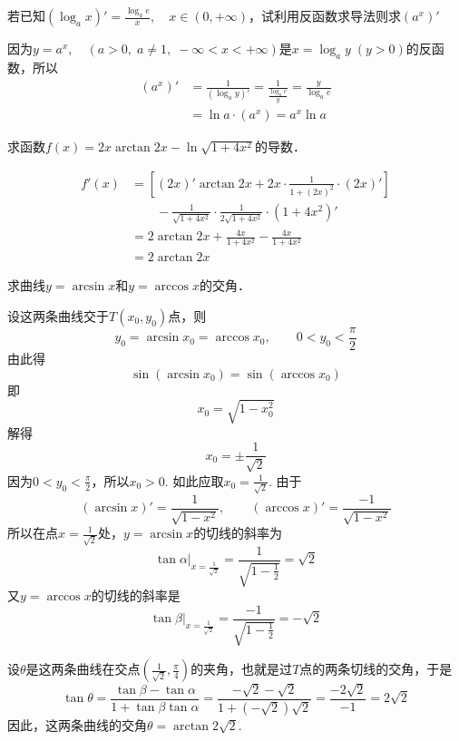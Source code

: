 \begin{example}
若已知$(\log_a x)'=\frac{\log_a e}{x},\quad x\in(0,+\infty)$，试利用反函数求导法则求$(a^x)'$    
\end{example}

\begin{solution}
    因为$y=a^x,\quad (a>0,\; a\ne 1,\; -\infty<x<+\infty)$是$x=\log_a y\; (y>0)$的反函数，所以
\begin{align*}
    (a^x)'&=\frac{1}{(\log_a y)'}=\frac{1}{\frac{\log_a e}{y}}=\frac{y}{\log_a e}\\
    &=\ln a\cdot (a^x)=a^x\ln a
\end{align*}
\end{solution}

\begin{example}
求函数$f(x)=2x\arctan 2x-\ln\sqrt{1+4x^2}$的导数．
\end{example}

\begin{solution}
\begin{align*}
    f'(x)&=\left[(2x)'\arctan 2x+2x\cdot \frac{1}{1+(2x)^2}\cdot (2x)'\right]\\
    &\qquad -\frac{1}{\sqrt{1+4x^2}}\cdot \frac{1}{2\sqrt{1+4x^2}}\cdot (1+4x^2)'\\
    &=2\arctan 2x+\frac{4x}{1+4x^2}-\frac{4x}{1+4x^2}\\
    &=2\arctan 2x
\end{align*}
\end{solution}


\begin{example}
求曲线$y=\arcsin x$和$y=\arccos x$的交角．
\end{example}

\begin{solution}
设这两条曲线交于$T(x_0,y_0)$点，则
\[y_0=\arcsin x_0=\arccos x_0,\qquad 0<y_0<\frac{\pi}{2}\]
  由此得
\begin{equation}
    \sin(\arcsin x_0)=\sin(\arccos x_0)
\end{equation}  
即
\[x_0=\sqrt{1-x^2_0}\]
解得
\[x_0=\pm\frac{1}{\sqrt{2}}\]
因为$0<y_0<\frac{\pi}{2}$，所以$x_0>0$. 如此应取$x_0=\frac{1}{\sqrt{2}}$. 由于
\[(\arcsin x)'=\frac{1}{\sqrt{1-x^2}},\qquad (\arccos x)'=\frac{-1}{\sqrt{1-x^2}}\]
所以在点$x=\frac{1}{\sqrt{2}}$处，$y=\arcsin x$的切线的斜率为
\[\tan\alpha\Big|_{x=\tfrac{1}{\sqrt{2}}}=\frac{1}{\sqrt{1-\frac{1}{2}}}=\sqrt{2}\]
又$y=\arccos x$的切线的斜率是
\[\tan\beta\Big|_{x=\tfrac{1}{\sqrt{2}}}=\frac{-1}{\sqrt{1-\frac{1}{2}}}=-\sqrt{2}\]

设$\theta$是这两条曲线在交点$\left(\frac{1}{\sqrt{2}},\frac{\pi}{4}\right)$的夹角，也就是过$T$点的两条切线的交角，于是
\[\tan\theta=\frac{\tan\beta-\tan\alpha}{1+\tan\beta\tan\alpha}=\frac{-\sqrt{2}-\sqrt{2}}{1+\left(-\sqrt{2}\right)\sqrt{2}}=\frac{-2\sqrt{2}}{-1}=2\sqrt{2}\]
因此，这两条曲线的交角$\theta=\arctan 2\sqrt{2}$. 
\end{solution}

